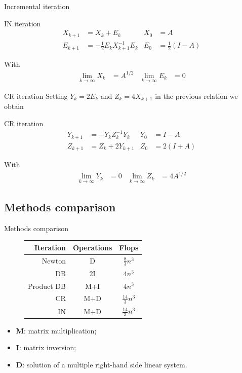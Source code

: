\documentclass{beamer}
\theoremstyle{plain}
\theoremstyle{definition}
\theoremstyle{remark}
\newcommand{\pa}[1]{\left(#1\right)}
\begin{document}
\begin{frame}{Incremental iteration}
  \begin{block}{IN iteration}
    \begin{align*}
      X_{k+1} &= X_k + E_k & X_0 &= A \\
      E_{k+1} &= -\frac{1}{2} E_k X_{k+1}^{-1} E_k & E_0
                                 &=\frac{1}{2}\pa{I-A}
    \end{align*}
  \end{block}
  With 
  \begin{align*}
    \lim _{k\to \infty} X_k & = A^{1/2} & \lim _{k\to \infty} E_k &=0
  \end{align*}
\end{frame}

\begin{frame}{CR iteration}
  Setting $Y_k = 2E_k$ and $Z_k = 4X_{k+1}$ in the previous relation
  we obtain
  \begin{block}{CR iteration}
    \begin{align*}
      Y_{k+1} &= -Y_kZ_k^{-1}Y_k & Y_0 &= I -A \\
      Z_{k+1} &= Z_k + 2Y_{k+1} & Z_0 &= 2(I+A)
    \end{align*}
  \end{block}
  With 
  \begin{align*}
    \lim _{k\to \infty} Y_k & = 0 & \lim _{k\to \infty} Z_k &=
                                                              4A^{1/2}
  \end{align*}
\end{frame}

\subsection{Methods comparison}

\begin{frame}{Methods comparison}
  \begin{figure}
    \begin{tabular}{ r | c c }
      Iteration & Operations & Flops \\
      \hline
      Newton & D & $\frac{8}{3}n^3$ \\
      DB & 2I & $4n^3$ \\
      Product DB & M+I & $4n^3$ \\
      CR & M+D & $\frac{14}{3}n^3$ \\
      IN & M+D & $\frac{14}{3}n^3$
    \end{tabular}
  \end{figure}
  \begin{itemize}
  \item \textbf{M}: matrix multiplication;
  \item \textbf{I}: matrix inversion;
  \item \textbf{D}: solution of a multiple right-hand side linear system.
  \end{itemize}
\end{frame}
\end{document}

